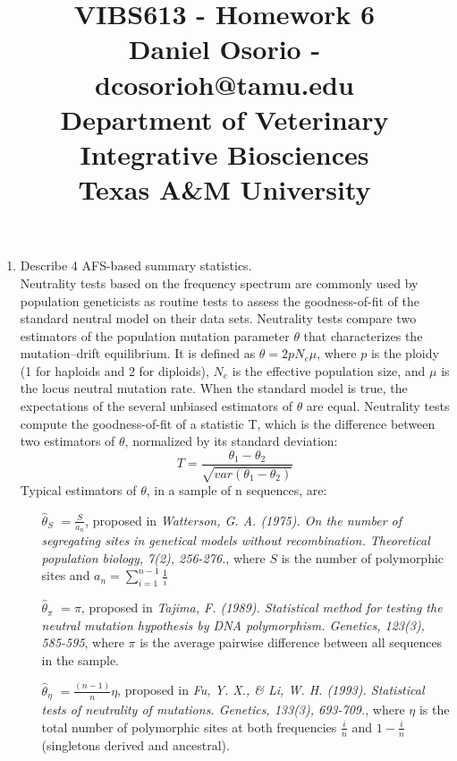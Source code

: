 \documentclass[12pt,a4paper]{paper}
\begin{document}

\title{VIBS613 - Homework 6\\\small{Daniel Osorio - dcosorioh@tamu.edu\\Department of Veterinary Integrative Biosciences\\Texas A\&M University}}
\maketitle
\begin{enumerate}
\item Describe 4 AFS-based summary statistics.\\
Neutrality tests based on the frequency spectrum are commonly used
by population geneticists as routine tests to assess the goodness-of-fit of the standard neutral model on their data sets. Neutrality tests compare two estimators of the population mutation parameter $\theta$ that characterizes the mutation–drift equilibrium. It is defined as $\theta = 2pN_{e}\mu$, where $p$ is the ploidy (1 for haploids and 2 for diploids), $N_{e}$ is the effective population size, and $\mu$ is the locus neutral mutation rate. When the standard model is true, the expectations of the several unbiased estimators of $\theta$ are equal. Neutrality tests compute the goodness-of-fit of a statistic T, which is the difference between two estimators of $\theta$, normalized by its standard deviation:
\[
T = \frac{\theta_{1} - \theta_{2}}{\sqrt{var(\theta_{1} - \theta_{2})}}
\]
Typical estimators of $\theta$, in a sample of n sequences, are:
\begin{enumerate}
\item [$\hat\theta_{S}$]$ = \frac{S}{a_{n}}$, proposed in \textit{Watterson, G. A. (1975). On the number of segregating sites in genetical models without recombination. Theoretical population biology, 7(2), 256-276.}, where $S$ is the number of polymorphic sites and $a_{n} = \sum_{i = 1}^{n-1}\frac{1}{i}$
\item [$\hat\theta_{\pi}$]$ = \pi$, proposed in \textit{Tajima, F. (1989). Statistical method for testing the neutral mutation hypothesis by DNA polymorphism. Genetics, 123(3), 585-595}, where $\pi$ is the average pairwise difference between all sequences in the sample.
\item [$\hat\theta_{\eta}$]$ = \frac{(n-1)}{n}\eta$, proposed in \textit{Fu, Y. X., \& Li, W. H. (1993). Statistical tests of neutrality of mutations. Genetics, 133(3), 693-709.}, where $\eta$ is the total number of polymorphic sites at both frequencies $\frac{i}{n}$ and $1-\frac{i}{n}$ (singletons derived and ancestral).

\end{enumerate}
\end{enumerate}
\end{document}
